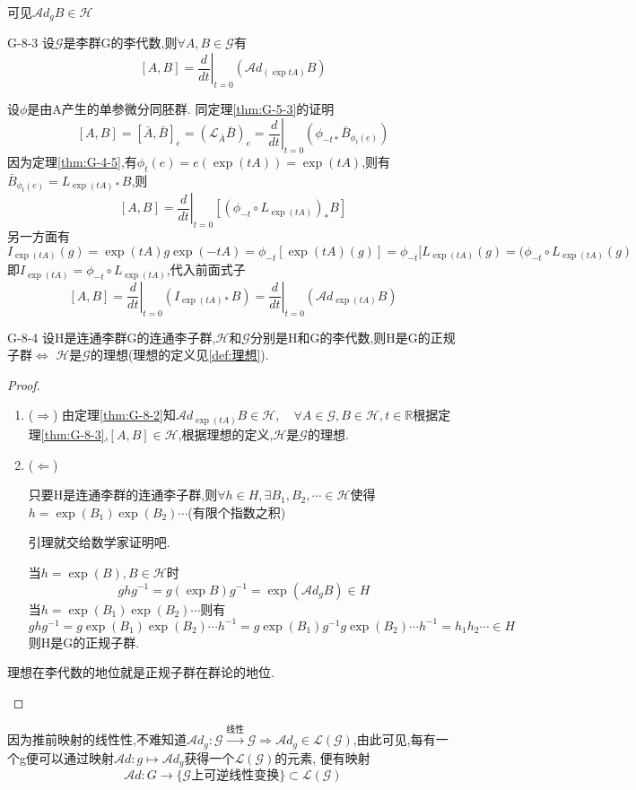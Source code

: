 \documentclass[../main.tex]{subfiles}
\begin{document}
可见$\mathscr{A}\!d_gB \in \mathscr{H}$
\begin{theorem}{}{G-8-3}
	设$\mathscr{G}$是李群G的李代数,则$\forall A,B \in \mathscr{G}$有$$
		[A,B] = \left.\frac{d}{dt}\right|_{t=0} (\mathscr{A}\!d_{(\exp tA)}B)$$
\end{theorem}
设$\phi$是由A产生的单参微分同胚群.
同定理\ref{thm:G-5-3}的证明$$
	[A,B] = [\bar{A},\bar{B}]_e = (\mathscr{L}_{\bar{A}}\bar{B})_e = \left.\frac{d}{dt}\right|_{t=0}(\phi_{-t*}\bar{B}_{\phi_{t}(e)})$$
因为定理\ref{thm:G-4-5},有$\phi_t(e) = e (\exp(tA)) = \exp(tA)$,则有$\bar{B}_{\phi_t(e)} = L_{\exp(tA)*}B$,则$$
	[A,B] = \left.\frac{d}{dt}\right|_{t=0}[(\phi_{-t} \circ L_{\exp(tA)})_{*}B]$$
另一方面有$$
	I_{\exp (tA)}(g) = \exp(tA) g \exp(-tA) = \phi_{-t}[\exp (tA)(g)] = \phi_{-t}[L_{\exp(tA)}(g) = (\phi_{-t}\circ L_{\exp(tA)}(g)$$
即$I_{\exp(tA)} = \phi_{-t}\circ L_{\exp (tA)}$,代入前面式子$$
	[A,B] = \left.\frac{d}{dt}\right|_{t=0}(I_{\exp(tA)*}B) = \left.\frac{d}{dt}\right|_{t=0}(\mathscr{A}\!d_{\exp(tA)}B)$$
\begin{theorem}
  {}{G-8-4}
	设H是连通李群G的连通李子群,$\mathscr{H}$和$\mathscr{G}$分别是H和G的李代数,则H是G的正规子群$\Leftrightarrow$ $\mathscr{H}$是$\mathscr{G}$的理想(理想的定义见\ref{def:理想}).
\end{theorem}
\begin{proof}
	\begin{enumerate}
		\item ($\Rightarrow$) 由定理\ref{thm:G-8-2}知$\mathscr{A}\!d_{\exp(tA)}B \in \mathscr{H},\quad \forall A \in \mathscr{G} ,B\in \mathscr{H}, t \in \mathbb{R}$根据定理\ref{thm:G-8-3},$[A,B] \in \mathscr{H}$,根据理想的定义,$\mathscr{H}$是$\mathscr{G}$的理想.
		\item ($\Leftarrow$) \begin{lemma}
			      只要H是连通李群的连通李子群,则$\forall h \in H,\exists B_1,B_2,\cdots \in \mathscr{H}$使得$h = \exp(B_1)\exp(B_2)\cdots$(有限个指数之积)
		      \end{lemma}引理就交给数学家证明吧.

		      当$h = \exp(B),B\in \mathscr{H}$时$$
			      ghg^{-1} = g(\exp{B})g^{-1} = \exp(\mathscr{A}\!d_gB) \in H$$当$h = \exp(B_1) \exp(B_2) \cdots$则有$$
			      ghg^{-1} = g\exp(B_1) \exp(B_2)\cdots h^{-1} = g\exp(B_1) g^{-1}g\exp(B_2)\cdots h^{-1} = h_1 h_2 \cdots \in H$$则H是G的正规子群.
	\end{enumerate}
	\begin{note}
		理想在李代数的地位就是正规子群在群论的地位.
	\end{note}
\end{proof}
因为推前映射的线性性,不难知道$\mathscr{A}\!d_g:\mathscr{G}\xrightarrow{\text{线性}} \mathscr{G} \Rightarrow \mathscr{A}\!d_g\in \mathscr{L}(\mathscr{G})$,由此可见,每有一个g便可以通过映射$\mathscr{A}\!d:g\mapsto \mathscr{A}\!d_g$获得一个$\mathscr{L}(\mathscr{G})$的元素,
便有映射$$
	\mathscr{A}\!d:G\rightarrow \{\mathscr{G}\text{上可逆线性变换}\} \subset \mathscr{L}(\mathscr{G})$$
\end{document}
